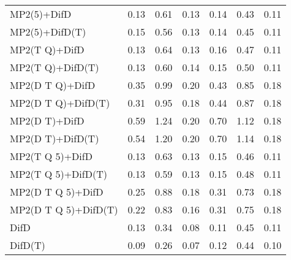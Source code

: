 \begin{table}
\begin{tabular}{l l l l l l l }
    MP2(5)+DifD & 0.13 & 0.61 & 0.13 & 0.14 & 0.43 & 0.11 \\ 
    MP2(5)+DifD(T) & 0.15 & 0.56 & 0.13 & 0.14 & 0.45 & 0.11 \\ 
    MP2(T Q)+DifD & 0.13 & 0.64 & 0.13 & 0.16 & 0.47 & 0.11 \\ 
    MP2(T Q)+DifD(T) & 0.13 & 0.60 & 0.14 & 0.15 & 0.50 & 0.11 \\ 
    MP2(D T Q)+DifD & 0.35 & 0.99 & 0.20 & 0.43 & 0.85 & 0.18 \\ 
    MP2(D T Q)+DifD(T) & 0.31 & 0.95 & 0.18 & 0.44 & 0.87 & 0.18 \\ 
    MP2(D T)+DifD & 0.59 & 1.24 & 0.20 & 0.70 & 1.12 & 0.18 \\ 
    MP2(D T)+DifD(T) & 0.54 & 1.20 & 0.20 & 0.70 & 1.14 & 0.18 \\ 
    MP2(T Q 5)+DifD & 0.13 & 0.63 & 0.13 & 0.15 & 0.46 & 0.11 \\ 
    MP2(T Q 5)+DifD(T) & 0.13 & 0.59 & 0.13 & 0.15 & 0.48 & 0.11 \\ 
    MP2(D T Q 5)+DifD & 0.25 & 0.88 & 0.18 & 0.31 & 0.73 & 0.18 \\ 
    MP2(D T Q 5)+DifD(T) & 0.22 & 0.83 & 0.16 & 0.31 & 0.75 & 0.18 \\ 
    DifD & 0.13 & 0.34 & 0.08 & 0.11 & 0.45 & 0.11 \\ 
    DifD(T) & 0.09 & 0.26 & 0.07 & 0.12 & 0.44 & 0.10 \\ 
    \hline
  \end{tabular}
\end{table}
